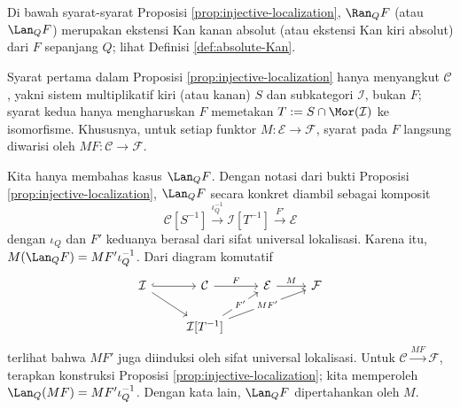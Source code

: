 \begin{proposisi}\label{prop:localization-functor-abs}
	Di bawah syarat-syarat Proposisi \ref{prop:injective-localization},
	$\Ran_Q F$ (atau $\Lan_Q F$) merupakan ekstensi Kan kanan absolut (atau
	ekstensi Kan kiri absolut) dari $F$ sepanjang $Q$; lihat Definisi
	\ref{def:absolute-Kan}.
\end{proposisi}
\begin{bukti}
	Syarat pertama dalam Proposisi \ref{prop:injective-localization} hanya
	menyangkut $\mathcal{C}$, yakni sistem multiplikatif kiri (atau kanan)
	$S$ dan subkategori $\mathcal{I}$, bukan $F$; syarat
	kedua hanya mengharuskan $F$ memetakan
	$T := S \cap \Mor(\mathcal{I})$ ke isomorfisme. Khususnya, untuk setiap
	funktor $M: \mathcal{E} \to \mathcal{F}$, syarat pada $F$ langsung
	diwarisi oleh $MF: \mathcal{C} \to \mathcal{F}$.

	Kita hanya membahas kasus $\Lan_Q F$. Dengan notasi dari bukti Proposisi
	\ref{prop:injective-localization}, $\Lan_Q F$ secara konkret diambil
	sebagai komposit
	\[ \mathcal{C}[S^{-1}] \xrightarrow{\iota_Q^{-1}} \mathcal{I}[T^{-1}] \xrightarrow{F'} \mathcal{E} \]
	dengan $\iota_Q$ dan $F'$ keduanya berasal dari sifat universal
	lokalisasi. Karena itu, $M (\Lan_Q F) = MF' \iota_Q^{-1}$. Dari diagram
	komutatif
	\[\begin{tikzcd}
		\mathcal{I} \arrow[hookrightarrow, r] \arrow[rd] & \mathcal{C} \arrow[r, "F"] & \mathcal{E} \arrow[r, "M"] & \mathcal{F} \\
		& \mathcal{I}[T^{-1}] \arrow[ru, "{F'}" description] \arrow[rru, "{MF'}" description] & &
	\end{tikzcd}\]
	terlihat bahwa $MF'$ juga diinduksi oleh sifat universal lokalisasi.
	Untuk $\mathcal{C} \xrightarrow{MF} \mathcal{F}$, terapkan konstruksi
	Proposisi \ref{prop:injective-localization}; kita memperoleh
	$\Lan_Q (MF) = MF' \iota_Q^{-1}$. Dengan kata lain, $\Lan_Q F$
	dipertahankan oleh $M$.
\end{bukti}
